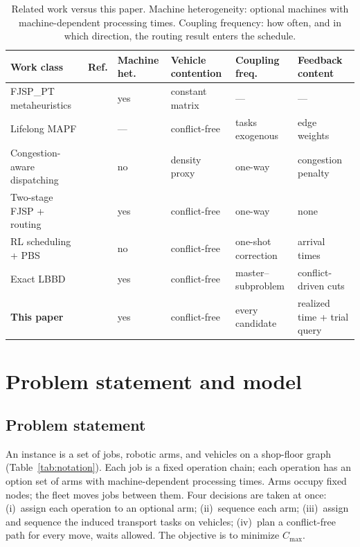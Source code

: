 \documentclass[manuscript,screen,review]{acmart}
\begin{document}
\begin{table}[t]
  \caption{Related work versus this paper.
Machine heterogeneity: optional machines with machine-dependent processing times.
Coupling frequency: how often, and in which direction, the routing result enters the schedule.}
\label{tab:related}
\footnotesize
\begin{tabular}{@{}lclll l@{}}
\toprule
Work class & Ref. & Machine het. & Vehicle contention & Coupling freq. & Feedback content \\
\midrule
FJSP\_PT metaheuristics & \cite{meng2025cp,qin2026knowledge,fu2025integrated}
  & yes & constant matrix & --- & --- \\
Lifelong MAPF & \cite{gao2023mapf,zhang2024guidance}
  & --- & conflict-free & tasks exogenous & edge weights \\
Congestion-aware dispatching & \cite{kim2026congestion}
  & no & density proxy & one-way & congestion penalty \\
Two-stage FJSP + routing & \cite{sun2023integrated}
  & yes & conflict-free & one-way & none \\
RL scheduling + PBS & \cite{li2026framework}
  & no & conflict-free & one-shot correction & arrival times \\
Exact LBBD & \cite{vanos2026exact}
  & yes & conflict-free & master--subproblem & conflict-driven cuts \\
\textbf{This paper} &
  & yes & conflict-free & every candidate & realized time + trial query \\
\bottomrule
\end{tabular}
\end{table}


\section{Problem statement and model}
\label{sec:Chapter_III}
\subsection{Problem statement}

An instance is a set of jobs, robotic arms, and vehicles on a shop-floor graph (Table~\ref{tab:notation}).
Each job is a fixed operation chain; each operation has an option set of arms with machine-dependent processing times.
Arms occupy fixed nodes; the fleet moves jobs between them.
Four decisions are taken at once:
(i)~assign each operation to an optional arm;
(ii)~sequence each arm;
(iii)~assign and sequence the induced transport tasks on vehicles;
(iv)~plan a conflict-free path for every move, waits allowed.
The objective is to minimize $C_{\max}$.
\end{document}
